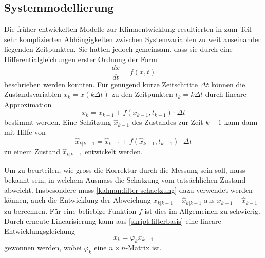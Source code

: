 \subsection{Systemmodellierung\label{subsection:systemmodellierung}}
Die früher entwickelten Modelle zur Klimaentwicklung resultierten in
zum Teil sehr komplizierten Abhängigkeiten zwischen Systemvariablen
zu weit auseinander liegenden Zeitpunkten.
Sie hatten jedoch gemeinsam, dass sie durch eine Differentialgleichungen
erster Ordnung der Form
\[
\frac{dx}{dt} = f(x,t)
\]
beschrieben werden konnten.
Für genügend kurze Zeitschritte $\Delta t$ können die Zustandsvariablen
$x_k = x(k\Delta t)$ zu den Zeitpunkten $t_k=k\Delta t$
durch lineare Approximation
\[
x_k = x_{k-1} + f(x_{k-1}, t_{k-1}) \cdot \Delta t
\]
bestimmt werden.
Eine Schätzung $\hat{x}_{k-1}$ des Zustandes zur Zeit $k-1$ 
kann dann mit Hilfe von
\begin{equation}
\hat{x}_{k|k-1} = \hat{x}_{k-1} + f(\hat{x}_{k-1},t_{k-1})\cdot \Delta t
\label{kalman:filter-schaetzung}
\end{equation}
zu einem Zustand $\hat{x}_{k|k-1}$ entwickelt werden.

Um zu beurteilen, wie gross die Korrektur durch die Messung sein soll,
muss bekannt sein, in welchem Ausmass die Schätzung vom tatsächlichen
Zustand abweicht.
Insbesondere muss \eqref{kalman:filter-schaetzung} dazu verwendet werden
können, auch die Entwicklung der Abweichung $x_{k|k-1}-\hat{x}_{k|k-1}$
aus $x_{k-1} - \hat{x}_{k-1}$ zu berechnen.
Für eine beliebige Funktion $f$ ist dies im Allgemeinen zu schwierig.
Durch erneute Linearisierung kann aus
\eqref{skript:filterbasis} eine lineare Entwicklungsgleichung
\begin{equation}
x_k = \varphi_k x_{k-1}
\end{equation}
gewonnen werden, wobei $\varphi_k$ eine $n\times n$-Matrix ist.

